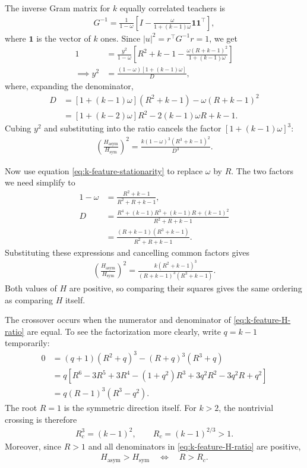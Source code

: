 \documentclass[11pt, reqno]{amsart}
\theoremstyle{notestyle}
\theoremstyle{defstyle}
\begin{document}
The inverse Gram matrix for $k$ equally correlated teachers is
\begin{align*}
    G^{-1}
    =\frac{1}{1-\omega}
    \left[I-\frac{\omega}{1+(k-1)\omega}\mathbf 1\mathbf 1^\top\right],
\end{align*}
where $\mathbf 1$ is the vector of $k$ ones.
Since $|u|^2=r^\top G^{-1}r=1$, we get
\begin{align*}
    1
    &=\frac{y^2}{1-\omega}
    \left[R^2+k-1-\frac{\omega(R+k-1)^2}{1+(k-1)\omega}\right] \\
    \implies y^2
    &=\frac{(1-\omega)[1+(k-1)\omega]}{D},
\end{align*}
where, expanding the denominator,
\begin{align*}
    D
    &=[1+(k-1)\omega](R^2+k-1)-\omega(R+k-1)^2 \\
    &=[1+(k-2)\omega]R^2-2(k-1)\omega R+k-1.
\end{align*}
Cubing $y^2$ and substituting into the ratio cancels the factor $[1+(k-1)\omega]^3$:
\begin{align*}
    \left(\frac{H_\text{asym}}{H_\text{sym}}\right)^2
    =\frac{k(1-\omega)^3(R^3+k-1)^2}{D^3}.
\end{align*}

Now use equation \eqref{eq:k-feature-stationarity} to replace $\omega$ by $R$.
The two factors we need simplify to
\begin{align*}
    1-\omega
    &=\frac{R^2+k-1}{R^2+R+k-1}, \\
    D
    &=\frac{R^4+(k-1)R^3+(k-1)R+(k-1)^2}{R^2+R+k-1} \\
    &=\frac{(R+k-1)(R^3+k-1)}{R^2+R+k-1}.
\end{align*}
Substituting these expressions and cancelling common factors gives
\begin{align}\label{eq:k-feature-H-ratio}
    \boxed{\left(\frac{H_\text{asym}}{H_\text{sym}}\right)^2
    =\frac{k(R^2+k-1)^3}{(R+k-1)^3(R^3+k-1)}.}
\end{align}
Both values of $H$ are positive, so comparing their squares gives the same ordering as comparing $H$ itself.

The crossover occurs when the numerator and denominator of \eqref{eq:k-feature-H-ratio} are equal.
To see the factorization more clearly, write $q=k-1$ temporarily:
\begin{align*}
    0
    &=(q+1)(R^2+q)^3-(R+q)^3(R^3+q) \\
    &=q\left[R^6-3R^5+3R^4-(1+q^2)R^3
       +3q^2R^2-3q^2R+q^2\right] \\
    &=q(R-1)^3(R^3-q^2).
\end{align*}
The root $R=1$ is the symmetric direction itself.
For $k>2$, the nontrivial crossing is therefore
\begin{align*}
    R_c^3=(k-1)^2,
    \qquad R_c=(k-1)^{2/3}>1.
\end{align*}
Moreover, since $R>1$ and all denominators in \eqref{eq:k-feature-H-ratio} are positive,
\begin{align*}
    H_\text{asym}>H_\text{sym}
    \quad\Longleftrightarrow\quad R>R_c.
\end{align*}
\end{document}

